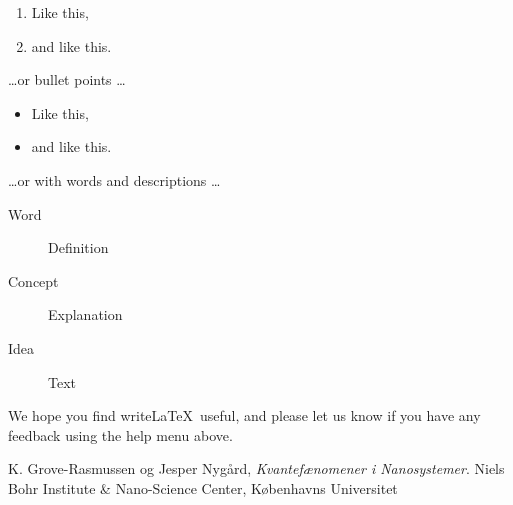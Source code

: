 \documentclass[a4paper]{article}
\begin{document}
      \begin{enumerate}
      \item Like this,
      \item and like this.
      \end{enumerate}
      \dots or bullet points \dots
      \begin{itemize}
      \item Like this,
      \item and like this.
      \end{itemize}
      \dots or with words and descriptions \dots
      \begin{description}
      \item[Word] Definition
      \item[Concept] Explanation
      \item[Idea] Text
      \end{description}
      
      We hope you find write\LaTeX\ useful, and please let us know if you have any feedback using the help menu above.
      
      \begin{thebibliography}{9}
        K. Grove-Rasmussen og Jesper Nygård,
        \emph{Kvantefænomener i Nanosystemer}.
        Niels Bohr Institute \& Nano-Science Center, Københavns Universitet
      
      \end{thebibliography}
      
\end{document}
